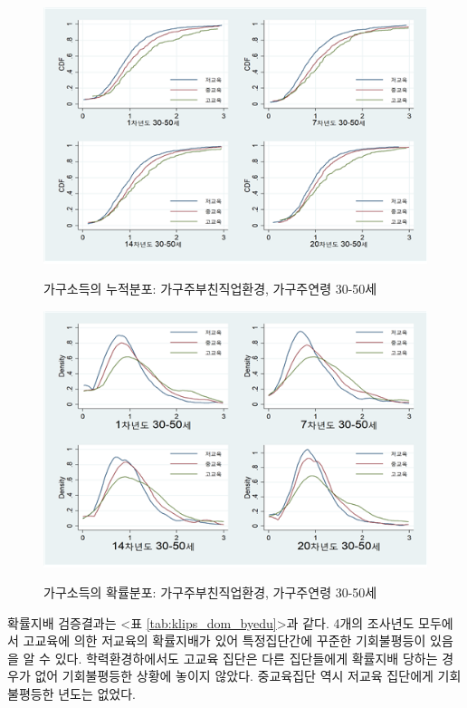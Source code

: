 \begin{figure}
    \centering
    \caption{가구소득의 누적분포: 가구주부친직업환경, 가구주연령 30-50세}
    \includegraphics[scale=.7]{figure/klips_cdf4_byjob.png}
    \label{fig:klips_cdf4_byjob}
\end{figure}

\begin{figure}
    \centering
    \caption{가구소득의 확률분포: 가구주부친직업환경, 가구주연령 30-50세}
    \includegraphics[scale=.7]{figure/klips_pdf4_byjob.png}
    \label{fig:klips_pdf4_byjob}
\end{figure}

확률지배 검증결과는 <표 \ref{tab:klips_dom_byedu}>과 같다.
4개의 조사년도 모두에서 고교육에 의한 저교육의 확률지배가 있어 특정집단간에 꾸준한 기회불평등이 있음을 알 수 있다.
학력환경하에서도 고교육 집단은 다른 집단들에게 확률지배 당하는 경우가 없어 기회불평등한 상황에 놓이지 않았다.
중교육집단 역시 저교육 집단에게 기회불평등한 년도는 없었다.

